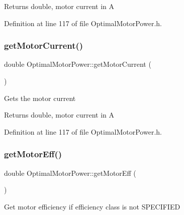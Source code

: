 \begin{DoxyReturn}{Returns}
double, motor current in A 
\end{DoxyReturn}


Definition at line 117 of file Optimal\+Motor\+Power.\+h.

\mbox{\label{class_optimal_motor_power_a2c058c4320a840018a420e10272cc4dd}} 
\subsubsection{\texorpdfstring{get\+Motor\+Current()}{getMotorCurrent()}\hspace{0.1cm}{\footnotesize\ttfamily [3/3]}}
{\footnotesize\ttfamily double Optimal\+Motor\+Power\+::get\+Motor\+Current (\begin{DoxyParamCaption}{ }\end{DoxyParamCaption})\hspace{0.3cm}{\ttfamily [inline]}}

Gets the motor current

\begin{DoxyReturn}{Returns}
double, motor current in A 
\end{DoxyReturn}


Definition at line 117 of file Optimal\+Motor\+Power.\+h.

\mbox{\label{class_optimal_motor_power_a341fe7520227f27f9cce23f3dc4cb0cb}} 
\subsubsection{\texorpdfstring{get\+Motor\+Eff()}{getMotorEff()}\hspace{0.1cm}{\footnotesize\ttfamily [1/3]}}
{\footnotesize\ttfamily double Optimal\+Motor\+Power\+::get\+Motor\+Eff (\begin{DoxyParamCaption}{ }\end{DoxyParamCaption})\hspace{0.3cm}{\ttfamily [inline]}}

Get motor efficiency if efficiency class is not S\+P\+E\+C\+I\+F\+I\+ED

